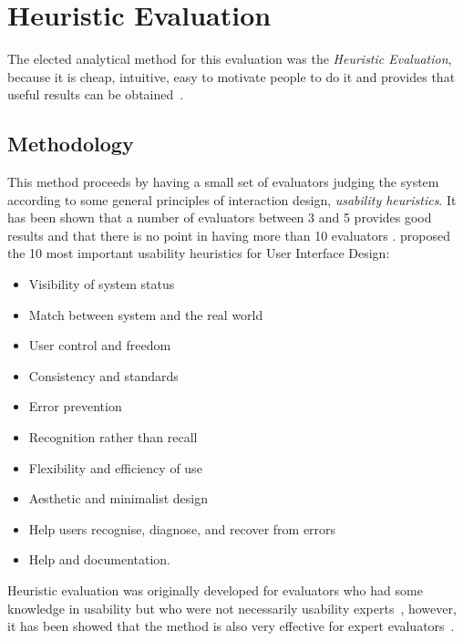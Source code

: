 \documentclass[a4paper]{article}
\begin{document}
\section{Heuristic Evaluation}

The elected analytical method for this evaluation was the \emph{Heuristic Evaluation}, because it is cheap, intuitive, easy to motivate people to do it and provides that useful results can be obtained~\citep{nielsen1990heuristic}.

\subsection{Methodology}
This method proceeds by having a small set of evaluators judging the system according to some general principles of interaction design, \emph{usability heuristics}. It has been shown that a number of evaluators between 3 and 5 provides good results and that there is no point in having more than 10 evaluators \citep{nielsen1990heuristic}. \citet{nielsen1995ten} proposed the 10 most important usability heuristics for User Interface Design:

\begin{itemize}
	\item Visibility of system status

	\item Match between system and the real world

	\item User control and freedom

	\item Consistency and standards

	\item Error prevention

	\item Recognition rather than recall

	\item Flexibility and efficiency of use

	\item Aesthetic and minimalist design

	\item Help users recognise, diagnose, and recover from errors

	\item Help and documentation.
\end{itemize}

Heuristic evaluation was originally developed for evaluators who had some knowledge in usability but who were not necessarily usability experts~\citep{nielsen1990heuristic}, however, it has been showed that the method is also very effective for expert evaluators~\citep{nielsen1992finding}.
\end{document}
